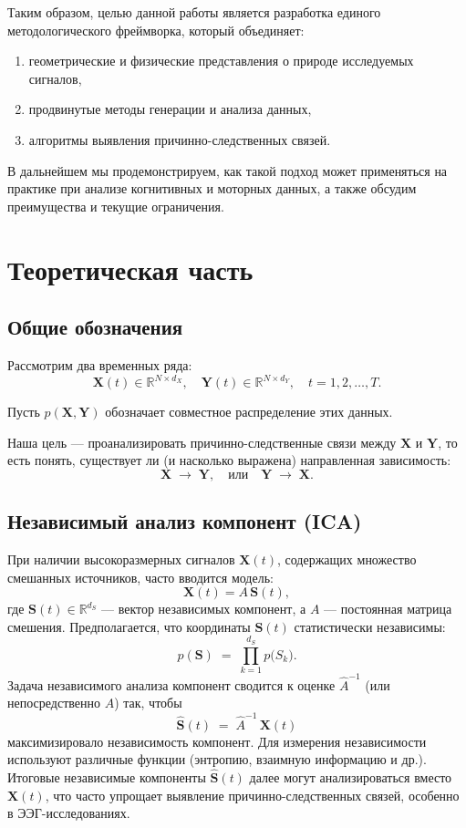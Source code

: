 \documentclass[a4paper, 12pt]{article}
\begin{document}
	Таким образом, целью данной работы является разработка единого методологического фреймворка, который объединяет:
	\begin{enumerate}
		\item геометрические и физические представления о природе исследуемых сигналов,
		\item продвинутые методы генерации и анализа данных,
		\item алгоритмы выявления причинно-следственных связей.
	\end{enumerate}
	
	В дальнейшем мы продемонстрируем, как такой подход может применяться на практике при анализе когнитивных и моторных данных, а также обсудим преимущества и текущие ограничения.
	
	\section{Теоретическая часть}
	
	\subsection{Общие обозначения}
	
	Рассмотрим два временных ряда: 
	\[
	\mathbf{X}(t) \in \mathbb{R}^{N \times d_X}, 
	\quad
	\mathbf{Y}(t) \in \mathbb{R}^{N \times d_Y},
	\quad
	t = 1,2,\dots,T.
	\]
	
	Пусть $p(\mathbf{X}, \mathbf{Y})$ обозначает совместное распределение этих данных.
	
	Наша цель --- проанализировать причинно-следственные связи между $\mathbf{X}$ и $\mathbf{Y}$, то есть понять, существует ли (и насколько выражена) направленная зависимость:
	\[
	\mathbf{X} \;\longrightarrow\; \mathbf{Y},
	\quad
	\text{или}
	\quad
	\mathbf{Y} \;\longrightarrow\; \mathbf{X}.
	\]
	
	\subsection{Независимый анализ компонент (ICA)}
	
	При наличии высокоразмерных сигналов $\mathbf{X}(t)$, содержащих множество смешанных источников, часто вводится модель:
	\[
	\mathbf{X}(t) = A\,\mathbf{S}(t),
	\]
	где $\mathbf{S}(t)\in\mathbb{R}^{d_S}$ --- вектор независимых компонент, а $A$ --- постоянная матрица смешения. Предполагается, что координаты $\mathbf{S}(t)$ статистически независимы:
	\[
	p(\mathbf{S}) \;=\; \prod_{k=1}^{d_S} p\bigl(S_k\bigr).
	\]
	Задача независимого анализа компонент сводится к оценке $\widehat{A}^{-1}$ (или непосредственно $A$) так, чтобы 
	\[
	\widehat{\mathbf{S}}(t) \;=\; \widehat{A}^{-1}\,\mathbf{X}(t)
	\]
	максимизировало независимость компонент. Для измерения независимости используют различные функции (энтропию, взаимную информацию и др.). Итоговые независимые компоненты $\widehat{\mathbf{S}}(t)$ далее могут анализироваться вместо $\mathbf{X}(t)$, что часто упрощает выявление причинно-следственных связей, особенно в ЭЭГ-исследованиях.
	
\end{document}
